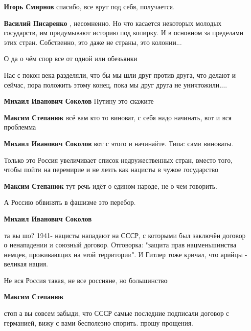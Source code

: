 \begin{itemize}
\begin{itemize}
\textbf{Игорь Смирнов} спасибо, все врут под себя, получается.

\textbf{Василий Писаренко} , несомненно.
Но что касается некоторых молодых государств, им придумывают историю под копирку. И в основном за пределами этих стран. Собственно, это даже не страны, это колонии...

\end{itemize} %

О да о чём спор все от одной или обезьянки


Нас с покон века разделяли, что бы мы шли друг против друга, что делают и
сейчас, пора положить этому конец, пока мы друг друга не уничтожили....

\begin{itemize} %
\textbf{Михаил Иванович Соколов} Путину это скажите

\textbf{Максим Степанюк} всё вам кто то виноват, с себя надо начинать, вот и вся проблемма

\textbf{Михаил Иванович Соколов} вот с этого и начинайте. Типа: сами виноваты.

Только это Россия увеличивает список недружественных стран, вместо того, чтобы
пойти на перемирие и не лезть как нацисты в чужое государство

\textbf{Максим Степанюк} тут речь идёт о едином народе, не о чем говорить.

А Россию обвинять в фашизме это перебор.

\textbf{Михаил Иванович Соколов} 

та вы шо? 1941- нацисты нападают на СССР, с которыми был заключён договор о
ненападении и союзный договор. Отговорка: "защита прав нацменьшинства немцев,
проживающих на этой территории". И Гитлер тоже кричал, что арийцы - великая
нация.

Не вся Россия такая, не все россияне, но большинство

\textbf{Максим Степанюк} 

стоп а вы совсем забыди, что СССР самые последние подписали
договор с германией, вижу с вами бесполезно спорить. прошу
прощения.



\end{itemize}
\end{itemize}
